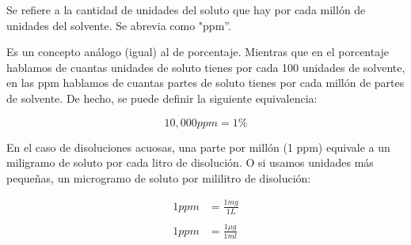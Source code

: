 Se refiere a la cantidad de unidades del soluto que hay por cada millón de unidades del solvente. Se abrevia como "ppm”.

Es un concepto análogo (igual) al de porcentaje. Mientras que en el porcentaje hablamos de cuantas unidades de soluto tienes por cada 100 unidades de solvente, en las ppm hablamos de cuantas partes de soluto tienes por cada millón de partes de solvente. De hecho, se puede definir la siguiente equivalencia:

\begin{equation*}
    10,000ppm = 1\%
\end{equation*}

En el caso de disoluciones acuosas, una parte por millón (1 ppm) equivale a un miligramo de soluto por cada litro de disolución. O si usamos unidades más pequeñas, un microgramo de soluto por mililitro de disolución:

\begin{align*}
    1ppm &= \frac{1mg}{1L}
    \\
    \\
    1ppm &= \frac{1\mu g}{1ml}
\end{align*}
